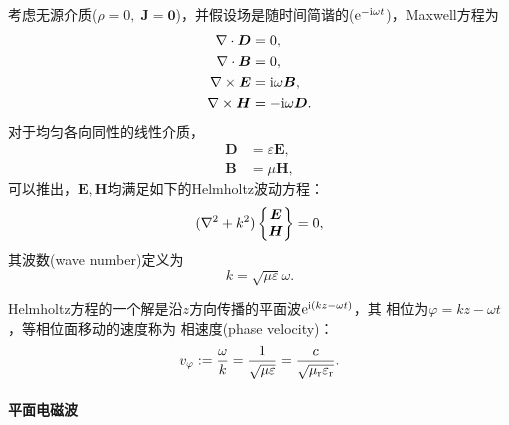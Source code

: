 考虑无源介质($\rho = 0,\;\bm J = \bm 0$)，并假设场是随时间简谐的($\mathop{}\!\mathrm{e}^{-\mathrm{i}\omega t}$)，Maxwell方程为
\begin{subequations}
    \begin{align}
        \nabla\cdot\bm D &= 0,\\
        \nabla\cdot\bm B &= 0,\\
        \nabla\times\bm E &= \mathrm{i}\omega\bm B,\\
        \nabla\times\bm H &= -\mathrm{i}\omega\bm D.
    \end{align}
\end{subequations}
对于均匀各向同性的线性介质，
\begin{align*}
    \bm D &= \varepsilon\bm E,\\
    \bm B &= \mu\bm H,
\end{align*}
可以推出，$\bm E,\bm H$均满足如下的Helmholtz波动方程：
\begin{equation}
    (\nabla^2 + k^2)\begin{Bmatrix}
        \bm E\\\bm H
    \end{Bmatrix} = 0,
\end{equation}
其波数(wave number)定义为
\begin{equation}
    k = \sqrt{\mu\varepsilon}\omega.
\end{equation}

Helmholtz方程的一个解是沿$z$方向传播的平面波$\mathop{}\!\mathrm{e}^{\mathrm{i}(kz-\omega t)}$，其
相位为$\varphi = kz - \omega t$，等相位面移动的速度称为
相速度(phase velocity)：
\begin{equation}
    v_\varphi := \frac{\omega}k = \frac1{\sqrt{\mu\varepsilon}} = \frac{c}{\sqrt{\mu_\mathrm r\varepsilon_\mathrm r}}.
\end{equation}

\paragraph{平面电磁波}

